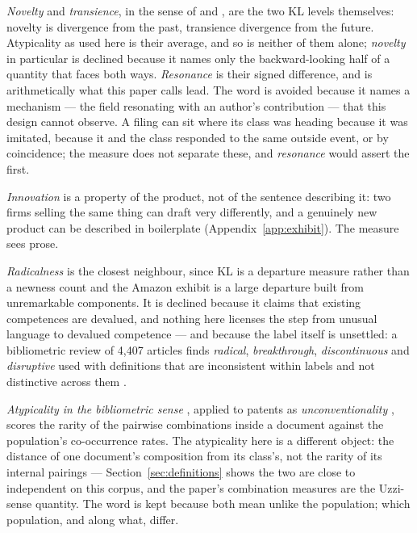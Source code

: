 
\emph{Novelty} and \emph{transience}, in the sense of
\citet{Murdock2017} and \citet{Barron2018}, are the two KL levels
themselves: novelty is divergence from the past, transience divergence
from the future. Atypicality as used here is their average, and so is
neither of them alone; \emph{novelty} in particular is declined because it
names only the backward-looking half of a quantity that faces both ways.
\emph{Resonance} is their signed difference, and is arithmetically what
this paper calls lead. The word is avoided because it names a
mechanism --- the field resonating with an author's contribution --- that
this design cannot observe. A filing can sit where its class was heading
because it was imitated, because it and the class responded to the same
outside event, or by coincidence; the measure does not separate these,
and \emph{resonance} would assert the first.

\emph{Innovation} is a property of the product, not of the sentence
describing it: two firms selling the same thing can draft very differently,
and a genuinely new product can be described in boilerplate
(Appendix~\ref{app:exhibit}). The measure sees prose.

\emph{Radicalness} \citep{DewarDutton1986, TushmanAnderson1986,
HendersonClark1990} is the closest neighbour, since KL is a departure
measure rather than a newness count and the Amazon exhibit is a large
departure built from unremarkable components. It is declined because it
claims that existing competences are devalued, and nothing here licenses the
step from unusual language to devalued competence --- and because the label
itself is unsettled: a bibliometric review of 4{,}407 articles finds
\emph{radical}, \emph{breakthrough}, \emph{discontinuous} and
\emph{disruptive} used with definitions that are inconsistent within labels
and not distinctive across them \citep{Verhoeven2025}.

\emph{Atypicality in the bibliometric sense} \citep{Uzzi2013}, applied to
patents as \emph{unconventionality} \citep{BerkesGaetani2021}, scores the
rarity of the pairwise combinations inside a document against the
population's co-occurrence rates. The atypicality here is a different
object: the distance of one document's composition from its class's, not
the rarity of its internal pairings --- Section~\ref{sec:definitions}
shows the two are close to independent on this corpus, and the paper's
combination measures are the Uzzi-sense quantity. The word is kept
because both mean unlike the population; which population, and along what,
differ.

